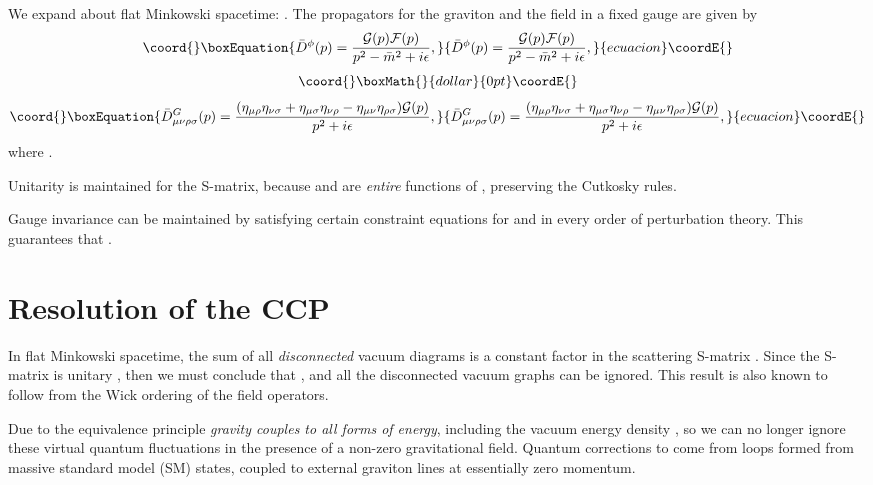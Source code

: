 \documentclass[a4paper,12pt]{article}
\begin{document}
We expand \coordHE{} about flat Minkowski spacetime:
\coordHE{}. The propagators for the
graviton and the \myHighlight{$\phi$}\coordHE{} field in a fixed gauge are given by
\begin{equation}\coord{}\boxEquation{
{\bar D}^\phi(p)=\frac{{\cal G}(p){\cal F}(p)}{p^2-{\bar m}^2+i\epsilon},
}{
{\bar D}^\phi(p)=\frac{{\cal G}(p){\cal F}(p)}{p^2-{\bar m}^2+i\epsilon},
}{ecuacion}\coordE{}\end{equation}
$$\coord{}\boxMath{  }{dollar}{0pt}\coordE{}$$
\begin{equation}\coord{}\boxEquation{
{\bar D}^G_{\mu\nu\rho\sigma}(p)=\frac{(\eta_{\mu\rho}\eta_{\nu\sigma}
+\eta_{\mu\sigma}\eta_{\nu\rho}-\eta_{\mu\nu}\eta_{\rho\sigma})
{\cal G}(p)}{p^2+i\epsilon},
}{
{\bar D}^G_{\mu\nu\rho\sigma}(p)=\frac{(\eta_{\mu\rho}\eta_{\nu\sigma}
+\eta_{\mu\sigma}\eta_{\nu\rho}-\eta_{\mu\nu}\eta_{\rho\sigma})
{\cal G}(p)}{p^2+i\epsilon},
}{ecuacion}\coordE{}\end{equation}
where \coordHE{}.

Unitarity is maintained for the S-matrix, because \coordHE{} and
\coordHE{} are {\it entire} functions of \coordHE{}, preserving the Cutkosky
rules.

Gauge invariance can be maintained by satisfying certain
constraint equations for \coordHE{} and \coordHE{} in every order of
perturbation theory.  This guarantees that \coordHE{}.

\section{\bf Resolution of the CCP}

In flat Minkowski spacetime, the sum of all {\it disconnected}
vacuum diagrams \coordHE{} is a constant factor in the
scattering S-matrix \coordHE{}. Since the S-matrix is unitary
\coordHE{}, then we must conclude that \coordHE{}, and all the disconnected vacuum graphs can be
ignored. This result is also known to follow from the Wick ordering of the field
operators.

Due to the equivalence principle {\it gravity couples to all
forms of energy}, including the vacuum energy density \coordHE{}, so we can no
longer ignore these virtual quantum fluctuations in the presence of a non-zero
gravitational field. Quantum corrections to \coordHE{} come from
loops formed from massive standard model (SM) states, coupled to external
graviton lines at essentially zero momentum.
\end{document}
